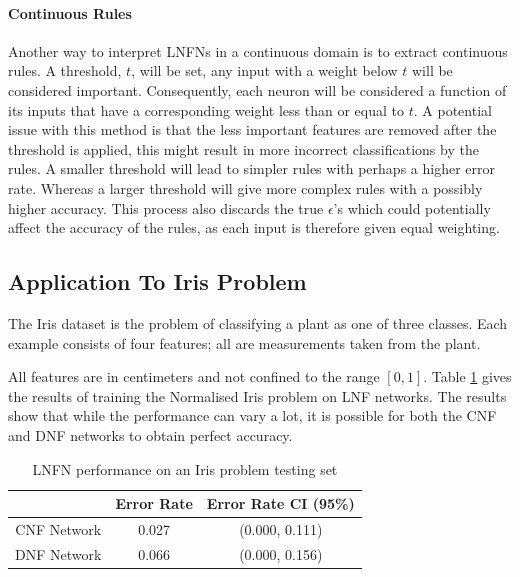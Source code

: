 \paragraph{Continuous Rules}
Another way to interpret LNFNs in a continuous domain is to extract continuous rules. A threshold, $t$, will be set, any input with a weight below $t$ will be considered important. Consequently, each neuron will be considered a function of its inputs that have a corresponding weight less than or equal to $t$. A potential issue with this method is that the less important features are removed after the threshold is applied, this might result in more incorrect classifications by the rules. A smaller threshold will lead to simpler rules with perhaps a higher error rate. Whereas a larger threshold will give more complex rules with a possibly higher accuracy. This process also discards the true $\epsilon$'s which could potentially affect the accuracy of the rules, as each input is therefore given equal weighting.

\subsection{Application To Iris Problem}


The Iris dataset \cite{Lichman:2013} is the problem of classifying a plant as one of three classes. Each example consists of four features; all are measurements taken from the plant.\\

\noindent
\begin{minipage}[t]{0.35\textwidth}
	All features are in centimeters and not confined to the range $[0, 1]$. Table \ref{tab:iris-network-peformance-comp} gives the results of training the Normalised Iris problem on LNF networks. The results show that while the performance can vary a lot, it is possible for both the CNF and DNF networks to obtain perfect accuracy.\\
\end{minipage}
\hspace{0.05\textwidth}
\begin{minipage}[t]{0.50\textwidth}
	\begin{table}[H]
		\begin{center}
			\begin{tabular}{| c | c | c |}
				\hline
				& Error Rate & Error Rate CI (95\%) \\
				\hline
				\hline
				CNF Network & 0.027 & (0.000, 0.111) \\
				\hline
				DNF Network & 0.066 & (0.000, 0.156) \\
				\hline
			\end{tabular}
		\end{center}
		\caption{LNFN performance on an Iris problem testing set}
		\label{tab:iris-network-peformance-comp}
	\end{table}
\end{minipage}



